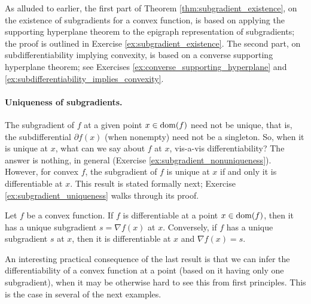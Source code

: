 As alluded to earlier, the first part of Theorem
\ref{thm:subgradient_existence}, on the existence of subgradients for a convex
function, is based on applying the supporting hyperplane theorem to the epigraph
representation of subgradients; the proof is outlined in Exercise
\ref{ex:subgradient_existence}. The second part, on subdifferentiability
implying convexity, is based on a converse supporting hyperplane theorem; see
Exercises \ref{ex:converse_supporting_hyperplane} and
\ref{ex:subdifferentiability_implies_convexity}. 

\paragraph{Uniqueness of subgradients.}

The subgradient of $f$ at a given point $x \in \operatorname{dom}(f)$ need not be unique, that
is, the subdifferential $\partial f(x)$ (when nonempty) need not be a
singleton. So, when it is unique at $x$, what can we say about $f$ at $x$,
vis-a-vis differentiability? The answer is nothing, in general (Exercise
\ref{ex:subgradient_nonuniqueness}). However, for convex $f$, the subgradient of
$f$ is unique at $x$ if and only it is differentiable at $x$. This result is
stated formally next; Exercise \ref{ex:subgradient_uniqueness} walks through its
proof. 

\begin{Theorem}
\label{thm:subgradient_uniqueness}
Let $f$ be a convex function. If $f$ is differentiable at a point $x \in
\operatorname{dom}(f)$, then it has a unique subgradient $s = \nabla f(x)$ at $x$. Conversely,
if $f$ has a unique subgradient $s$ at $x$, then it is differentiable at $x$ and
$\nabla f(x) = s$.  
\end{Theorem} 


An interesting practical consequence of the last result is that we can infer the
differentiability of a convex function at a point (based on it having only one
subgradient), when it may be otherwise hard to see this from first
principles. This is the case in several of the next examples.

\medskip

